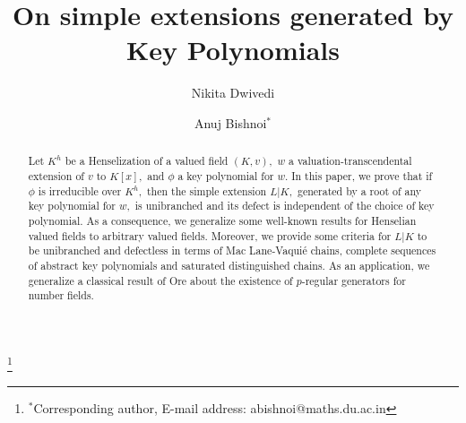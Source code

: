 \documentclass[11pt]{amsart}
\theoremstyle{definition}
\theoremstyle{remark}
\numberwithin{equation}{section}
\begin{document}
	
	\title[On simple extensions generated by Key Polynomials]{ On simple extensions generated by Key Polynomials}
	\author[Nikita Dwivedi]{Nikita Dwivedi}
	\address{Department of Mathematics\\ University of Delhi\\  Delhi-110007, India.}
	\author[Anuj Bishnoi]{Anuj Bishnoi$^\ast$}
	\address{Department of Mathematics\\  University of Delhi \\   Delhi-110007, India.}
	
	\begin{abstract}
Let $K^h$ be a Henselization of a valued field $(K,v),$ $w$ a valuation-transcendental extension of $v$ to $K[x],$ and $\phi$ a key polynomial for $w$. In this paper, we prove that if $\phi$ is irreducible over $K^h,$ then the simple extension $L|K,$ generated by a root of any key polynomial for $w,$ is unibranched and its defect is independent of the choice of key polynomial. As a consequence, we generalize some well-known results for Henselian valued fields to arbitrary valued fields. Moreover, we provide some criteria for $L|K$ to be unibranched and defectless in terms of Mac Lane-Vaqui\'e chains, complete sequences of abstract key polynomials and saturated distinguished chains. As an application, we generalize a classical result of Ore about the existence of $p$-regular generators for number fields.
	\end{abstract}
	\thanks{$^\ast$Corresponding author, E-mail address: abishnoi@maths.du.ac.in}
	\maketitle
	
	
\end{document}
